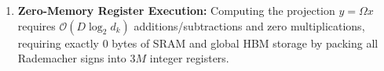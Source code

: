 \begin{theorem}
\begin{enumerate}[label=(\roman*)]
    \begin{equation}
    \mathbb{E}\left[ \hat{\phi}(q)^T \hat{\phi}(k) \right] = \exp\left( -\frac{\|\tilde{q} - \tilde{k}\|_2^2}{2\tau^2} \right)
    \label{eq:fwht_bochner_expectation}
    \end{equation}
    with variance bounded by $\operatorname{Var}(\hat{\phi}(q)^T \hat{\phi}(k)) \le \frac{d_k - 1}{D(d_k + 2)} + \mathcal{O}(d_k^{-2})$.
    \item \textbf{Zero-Memory Register Execution:} Computing the projection $y = \Omega x$ requires $\mathcal{O}(D \log_2 d_k)$ additions/subtractions and zero multiplications, requiring exactly $0$ bytes of SRAM and global HBM storage by packing all Rademacher signs into $3M$ integer registers.
\end{enumerate}
\end{theorem}

